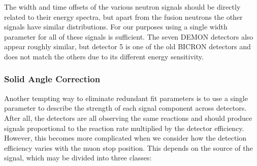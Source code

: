 The width and time offsets of the various neutron signals should be directly related to their energy spectra, but apart from the fusion neutrons the other signals have similar distributions.  
For our purposes using a single width parameter for all of these signals is sufficient.
The seven DEMON detectors also appear roughly similar, but detector 5 is one of the old BICRON detectors and does not match the others due to its different energy sensitivity.

\subsubsection{Solid Angle Correction}

Another tempting way to eliminate redundant fit parameters is to use a single parameter to describe the strength of each signal component across detectors.
After all, the detectors are all observing the same reactions and should produce signals proportional to the reaction rate multiplied by the detector efficiency.
However, this becomes more complicated when we consider how the detection efficiency varies with the muon stop position.
This depends on the source of the signal, which may be divided into three classes:

